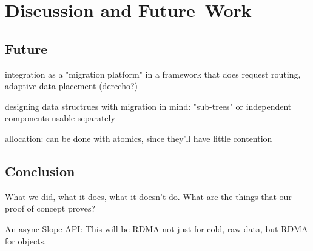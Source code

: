 \chapter{Discussion and Future~Work}
\label{chap:discussionfuture}


\section{Future}

integration as a "migration platform" in a framework that does request routing,
adaptive data placement (derecho?)

designing data structrues with migration in mind: "sub-trees" or independent
components usable separately

allocation: can be done with atomics, since they'll have little contention


\section{Conclusion}
What we did, what it does, \cite{kalia2016fasst} what it doesn't do. What are the things that our
proof of concept proves?

An async Slope API: This will be RDMA not just for cold, raw data, but RDMA for
objects.
